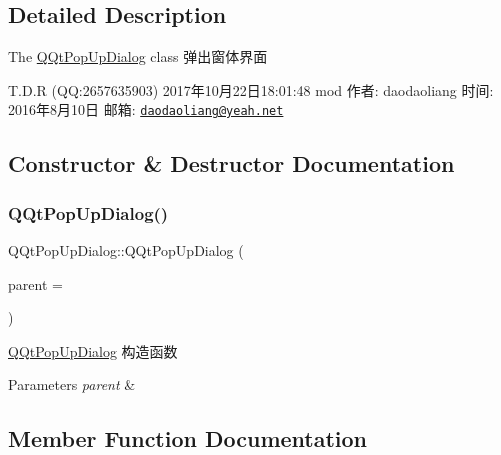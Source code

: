 \subsection{Detailed Description}
The \mbox{\hyperlink{class_q_qt_pop_up_dialog}{Q\+Qt\+Pop\+Up\+Dialog}} class 弹出窗体界面 

T.\+D.\+R (QQ\+:2657635903) 2017年10月22日18\+:01\+:48 mod 作者\+: daodaoliang 时间\+: 2016年8月10日 邮箱\+: \href{mailto:daodaoliang@yeah.net}{\tt daodaoliang@yeah.\+net} 

\subsection{Constructor \& Destructor Documentation}
\mbox{\label{class_q_qt_pop_up_dialog_a226cbee607124af399aaed2dabd35862}} 
\subsubsection{\texorpdfstring{Q\+Qt\+Pop\+Up\+Dialog()}{QQtPopUpDialog()}}
{\footnotesize\ttfamily Q\+Qt\+Pop\+Up\+Dialog\+::\+Q\+Qt\+Pop\+Up\+Dialog (\begin{DoxyParamCaption}\item[{Q\+Widget $\ast$}]{parent = {} }\end{DoxyParamCaption})\hspace{0.3cm}{\ttfamily [explicit]}}



\mbox{\hyperlink{class_q_qt_pop_up_dialog}{Q\+Qt\+Pop\+Up\+Dialog}} 构造函数 


\begin{DoxyParams}{Parameters}
{\em parent} & \\
\hline
\end{DoxyParams}


\subsection{Member Function Documentation}
\mbox{\label{class_q_qt_pop_up_dialog_a7745a81f4d839207cdcf9175ce960be1}} 
